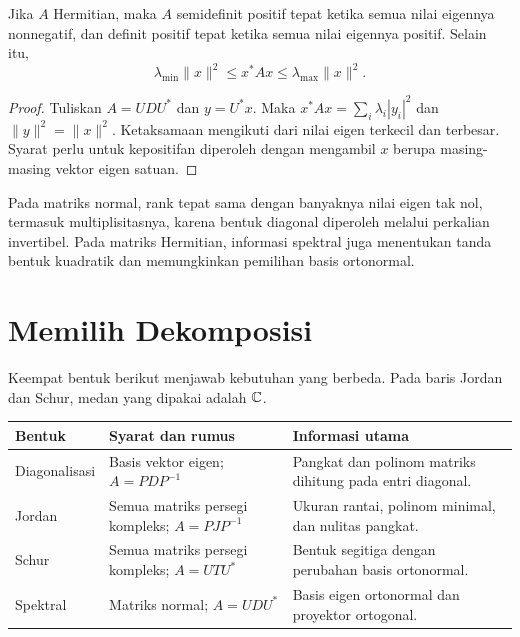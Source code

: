 \begin{prop}
    \label{eigen:kuadratik}
    Jika $A$ Hermitian, maka $A$ semidefinit positif tepat ketika
    semua nilai eigennya nonnegatif, dan definit positif tepat ketika
    semua nilai eigennya positif. Selain itu,
    \[
        \lambda_{\min}\|x\|^2\le x^*Ax\le\lambda_{\max}\|x\|^2.
    \]
\end{prop}
\begin{proof}
    Tuliskan $A=UDU^*$ dan $y=U^*x$.
    Maka $x^*Ax=\sum_i\lambda_i|y_i|^2$ dan
    $\|y\|^2=\|x\|^2$. Ketaksamaan mengikuti dari nilai eigen terkecil
    dan terbesar. Syarat perlu untuk kepositifan diperoleh dengan
    mengambil $x$ berupa masing-masing vektor eigen satuan.
\end{proof}

Pada matriks normal, rank tepat sama dengan banyaknya nilai eigen
tak nol, termasuk multiplisitasnya, karena bentuk diagonal diperoleh
melalui perkalian invertibel. Pada matriks Hermitian, informasi
spektral juga menentukan tanda bentuk kuadratik dan memungkinkan
pemilihan basis ortonormal.

\section{Memilih Dekomposisi}
\label{eigen:peta-dekomposisi}

Keempat bentuk berikut menjawab kebutuhan yang berbeda.
Pada baris Jordan dan Schur, medan yang dipakai adalah $\mathbb{C}$.

\begin{center}
    \small
    \renewcommand{\arraystretch}{1.35}
    \begin{tabular}{>{\raggedright\arraybackslash}p{.18\linewidth}
        >{\raggedright\arraybackslash}p{.29\linewidth}
        >{\raggedright\arraybackslash}p{.42\linewidth}}
        \textbf{Bentuk} & \textbf{Syarat dan rumus} & \textbf{Informasi utama}\\\hline
        Diagonalisasi & Basis vektor eigen; $A=PDP^{-1}$ &
            Pangkat dan polinom matriks dihitung pada entri diagonal.\\
        Jordan & Semua matriks persegi kompleks; $A=PJP^{-1}$ &
            Ukuran rantai, polinom minimal, dan nulitas pangkat.\\
        Schur & Semua matriks persegi kompleks; $A=UTU^*$ &
            Bentuk segitiga dengan perubahan basis ortonormal.\\
        Spektral & Matriks normal; $A=UDU^*$ &
            Basis eigen ortonormal dan proyektor ortogonal.\\\hline
    \end{tabular}
\end{center}

